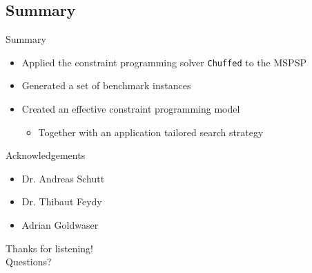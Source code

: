 \documentclass{beamer}
\begin{document}
\subsection{Summary}
\begin{frame}{Summary}
	\begin{itemize}
		\item Applied the constraint programming solver {\tt Chuffed} to the MSPSP\pause
		\vspace{2mm}
		\item Generated a set of benchmark instances\pause
		\vspace{2mm}
		\item Created an effective constraint programming model\vspace{2mm}
		\begin{itemize}
			\item Together with an application tailored search strategy
		\end{itemize}
	\end{itemize}
\end{frame}


\begin{frame}{Acknowledgements}
	\begin{itemize}
		\item Dr. Andreas Schutt
		\vspace{2mm}
		\item Dr. Thibaut Feydy
		\vspace{2mm}
		\item Adrian Goldwaser
	\end{itemize}
\end{frame}

\begin{frame}{}
	\centering
	{\Large Thanks for listening!\vspace{1cm}\\
	Questions?}
\end{frame}
\end{document}

